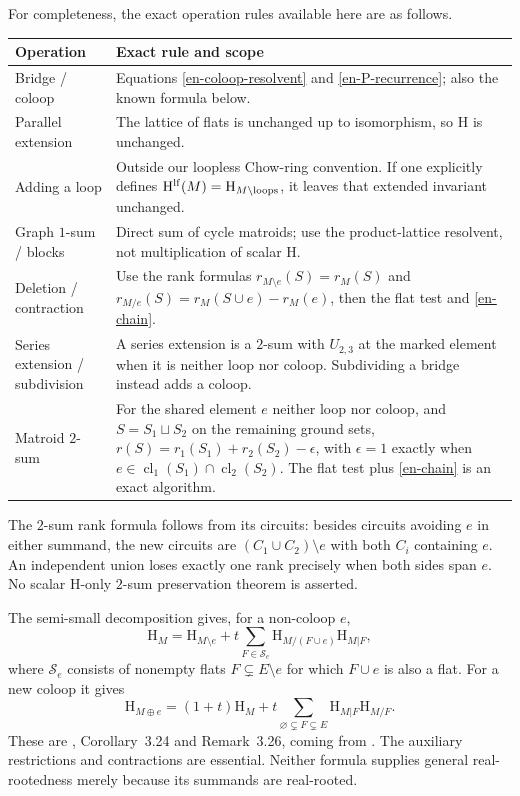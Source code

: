 \documentclass[12pt]{amsart}
\theoremstyle{definition}
\theoremstyle{remark}
\numberwithin{equation}{section}
\newcommand{\HCh}{\mathrm{H}}
\newcommand{\clmat}{\operatorname{cl}}
\begin{document}
\begin{samepage}
For completeness, the exact operation rules available here are as follows.
\begin{center}\small
\begin{tabular}{p{3.0cm}p{10.3cm}}
\toprule
Operation & Exact rule and scope\\\midrule
Bridge / coloop & Equations \eqref{en-coloop-resolvent} and \eqref{en-P-recurrence}; also the known formula below.\\
Parallel extension & The lattice of flats is unchanged up to isomorphism, so $\HCh$ is unchanged.\\
Adding a loop & Outside our loopless Chow-ring convention. If one explicitly defines $\HCh^{\rm lf}(M)=\HCh_{M\setminus\text{loops}}$, it leaves that extended invariant unchanged.\\
Graph $1$-sum / blocks & Direct sum of cycle matroids; use the product-lattice resolvent, not multiplication of scalar $\HCh$.\\
Deletion / contraction & Use the rank formulas $r_{M\setminus e}(S)=r_M(S)$ and $r_{M/e}(S)=r_M(S\cup e)-r_M(e)$, then the flat test and \eqref{en-chain}.\\
Series extension / subdivision & A series extension is a $2$-sum with $U_{2,3}$ at the marked element when it is neither loop nor coloop. Subdividing a bridge instead adds a coloop.\\
Matroid $2$-sum & For the shared element $e$ neither loop nor coloop, and $S=S_1\sqcup S_2$ on the remaining ground sets, $r(S)=r_1(S_1)+r_2(S_2)-\epsilon$, with $\epsilon=1$ exactly when $e\in\clmat_1(S_1)\cap\clmat_2(S_2)$. The flat test plus \eqref{en-chain} is an exact algorithm.\\\bottomrule
\end{tabular}
\end{center}
\end{samepage}
The $2$-sum rank formula follows from its circuits: besides circuits avoiding $e$ in either summand, the new circuits are $(C_1\cup C_2)\setminus e$ with both $C_i$ containing $e$. An independent union loses exactly one rank precisely when both sides span $e$. No scalar $\HCh$-only $2$-sum preservation theorem is asserted.

The semi-small decomposition gives, for a non-coloop $e$,
\[
 \HCh_M=\HCh_{M\setminus e}
 +t\sum_{F\in\mathcal S_e}\HCh_{M/(F\cup e)}\HCh_{M|F},
\]
where $\mathcal S_e$ consists of nonempty flats $F\subsetneq E\setminus e$ for which $F\cup e$ is also a flat. For a new coloop it gives
\[
 \HCh_{M\oplus e}=(1+t)\HCh_M+
 t\sum_{\varnothing\subsetneq F\subsetneq E}\HCh_{M|F}\HCh_{M/F}.
\]
These are \cite{FMSV24}, Corollary~3.24 and Remark~3.26, coming from \cite{BHM22}. The auxiliary restrictions and contractions are essential. Neither formula supplies general real-rootedness merely because its summands are real-rooted.
\end{document}
